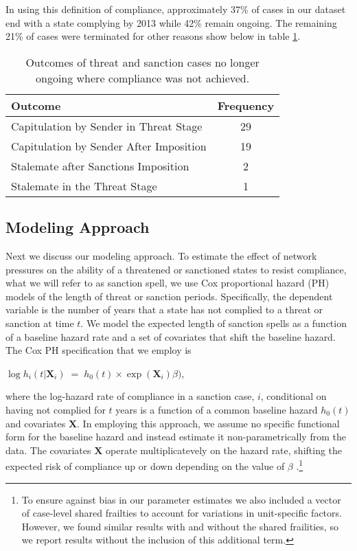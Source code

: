 In using this definition of compliance, approximately 37\% of cases in our dataset end with a state complying by 2013 while 42\% remain ongoing. The remaining 21\% of cases were terminated for other reasons show below in table \ref{tab:termCases}.

\begin{table}[ht]
	\centering
	\begin{tabular}{lc}
		\hline\hline
		Outcome & Frequency \\
		\hline
		Capitulation by Sender in Threat Stage & 29 \\
		Capitulation by Sender After Imposition & 19 \\
		Stalemate after Sanctions Imposition & 2 \\
		Stalemate in the Threat Stage & 1 \\
		\hline\hline
	\end{tabular}
	\caption{Outcomes of threat and sanction cases no longer ongoing where compliance was not achieved.}
	\label{tab:termCases}	
\end{table}
\FloatBarrier

\subsection*{Modeling Approach} 

Next we discuss our modeling approach. To estimate the effect of network pressures on the ability of a threatened or sanctioned states to resist compliance, what we will refer to as sanction spell, we use Cox proportional hazard (PH) models of the length of threat or sanction periods. Specifically, the dependent variable is the number of years that a state has not complied to a threat or sanction at time $t$. We model the expected length of sanction spells as a function of a baseline hazard rate and a set of covariates that shift the baseline hazard. The Cox PH specification that we employ is

\begin{center}
$\log h_{i}(t | \boldsymbol{X}_{i}) \; = \; h_{0}(t) \times \exp(\boldsymbol{X}_{i}) \beta)$,
\end{center}

where the log-hazard rate of compliance in a sanction case, $i$, conditional on having not complied for $t$ years is a function of a common baseline hazard $h_{0}(t)$ and covariates $\boldsymbol{X}$. In employing this approach, we assume no specific functional form for the baseline hazard and instead estimate it non-parametrically from the data. The covariates $\boldsymbol{X}$ operate multiplicatevely on the hazard rate, shifting the expected risk of compliance up or down depending on the value of $\beta$ \citep{crespo2013political}.\footnote{To ensure against bias in our parameter estimates we also included a vector of case-level shared frailties to account for variations in unit-specific factors. However, we found similar results with and without the shared frailities, so we report results without the inclusion of this additional term.} 

